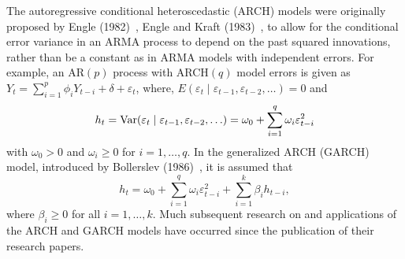 The autoregressive conditional heteroscedastic (ARCH) models were originally proposed by Engle (1982)~\cite{engle1982}, Engle and Kraft (1983)~\cite{engle1983}, to allow for the conditional error variance in an ARMA process to depend on the past squared innovations, rather than be a constant as in ARMA models with independent errors. For example, an AR$(p)$ process with ARCH$(q)$ model errors is given as $Y_t = \sum_{i=1}^p\phi_iY_{t-i} + \delta + \varepsilon_t$, where, $E(\varepsilon_t \;|\; \varepsilon_{t-1},\varepsilon_{t-2},\ldots)= 0$ and
	\begin{equation} \label{eqn:2ht}
	h_t= \var(\varepsilon_t \;|\; \varepsilon_{t-1}, \varepsilon_{t-2}, \ldots) = \omega_0 + \sum_{i=1}^q \omega_i \varepsilon_{t-i}^2
	\end{equation}
with $\omega_0 > 0$ and $\omega_i \geq 0$ for $i= 1, \ldots, q$. In the generalized ARCH (GARCH) model, introduced by Bollerslev (1986)~\cite{bollerslev1986}, it is assumed that
	\begin{equation} \label{eqn:2secondht}
	h_t = \omega_0 + \sum_{i=1}^q \omega_i \varepsilon_{t-i}^2 + \sum_{i=1}^k \beta_i h_{t-i},
	\end{equation}
where $\beta_i \geq 0$ for all $i = 1,\ldots,k$. Much subsequent research on and applications of the ARCH and GARCH models have occurred since the publication of their research papers.


